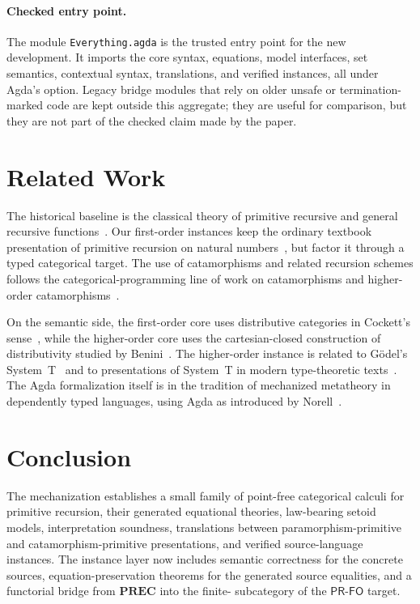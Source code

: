 \documentclass[sigplan,10pt,anonymous,review,screen]{acmart}
\newcommand{\PRFO}{\ensuremath{\mathsf{PR\mbox{-}FO}}}
\newcommand{\AgdaFile}[1]{\texttt{#1}}
\begin{document}
\paragraph{Checked entry point.}
The module \AgdaFile{Everything.agda} is the trusted entry point for the
new development.  It imports the core syntax, equations, model
interfaces, set semantics, contextual syntax, translations, and verified
instances, all under Agda's  option.  Legacy bridge
modules that rely on older unsafe or termination-marked code are kept
outside this aggregate; they are useful for comparison, but they are not
part of the checked claim made by the paper.

\section{Related Work}
\label{sec:related-work}

The historical baseline is the classical theory of primitive recursive
and general recursive functions~\cite{skolem23,curry41:_formal_recur_arith,kleene36:_gener_recur_funct_natur_number}.
Our first-order instances keep the ordinary textbook presentation of
primitive recursion on natural numbers~\cite{martin2019logik,wiki:Primitive_recursive_function},
but factor it through a typed categorical target.  The use of catamorphisms and
related recursion schemes follows the categorical-programming line of
work on catamorphisms and higher-order
catamorphisms~\cite{DBLP:conf/fpca/MeijerFP91,DBLP:conf/fpca/MeijerH95}.

On the semantic side, the first-order core uses distributive categories
in Cockett's sense~\cite{cockett_1993}, while the higher-order core uses
the cartesian-closed construction of distributivity studied by
Benini~\cite{https://doi.org/10.48550/arxiv.1406.0961}.  The
higher-order instance is related to G\"odel's System~T~\cite{goedel58}
and to presentations of System~T in modern type-theoretic
texts~\cite{DBLP:books/cu/Ha2016}.  The Agda formalization itself is in
the tradition of mechanized metatheory in dependently typed languages,
using Agda as introduced by Norell~\cite{DBLP:conf/afp/Norell08}.

\section{Conclusion}
\label{sec:conclusion}

The mechanization establishes a small family of point-free categorical
calculi for primitive recursion, their generated equational theories,
law-bearing setoid models, interpretation soundness, translations between
paramorphism-primitive and catamorphism-primitive presentations, and verified
source-language instances.  The instance layer now includes semantic
correctness for the concrete sources, equation-preservation theorems for
the generated source equalities, and a functorial bridge from
\(\mathbf{PREC}\) into the finite- subcategory of the
\PRFO{} target.
\end{document}

